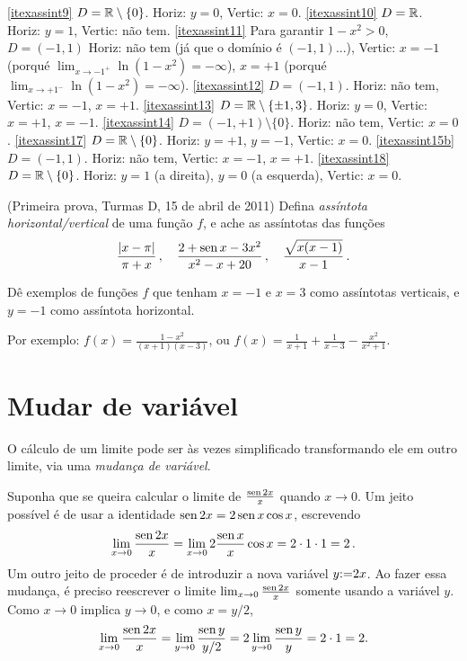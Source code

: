 \begin{exo}
\begin{sol}
\eqref{itexassint9} $D=\mathbb{R}\setminus\{0\}$. Horiz: $y=0$, Vertic: $x=0$.
\eqref{itexassint10} $D=\mathbb{R}$. Horiz: $y=1$, Vertic: não tem.
\eqref{itexassint11} Para garantir $1-x^2>0$, $D=(-1,1)$ Horiz: não 
tem (já que o domínio é $(-1,1)$...), Vertic: $x=-1$ (porqué
$\lim_{x\to -1^+}\ln (1-x^2)=-\infty$), $x=+1$ (porqué $\lim_{x\to
+1^-}\ln (1-x^2)=-\infty$).
\eqref{itexassint12} $D=(-1,1)$. Horiz: não tem, Vertic: $x=-1$, $x=+1$.
\eqref{itexassint13} $D=\mathbb{R}\setminus\{\pm 1, 3\}$. Horiz: $y=0$, 
Vertic: $x=+1$, $x=-1$.
\eqref{itexassint14} $D=(-1,+1)\setminus\{ 0\}$. Horiz: não tem, 
Vertic: $x=0$.
\eqref{itexassint17} $D=\mathbb{R}\setminus\{0\}$. Horiz: $y=+1$, $y=-1$, 
Vertic: $x=0$.
\eqref{itexassint15b} $D=(-1,1)$. Horiz: não tem, Vertic: $x=-1$, $x=+1$.
\eqref{itexassint18} $D=\mathbb{R}\setminus\{0\}$. Horiz: $y=1$ (a direita), $y=0$ (a esquerda), 
Vertic: $x=0$.
\end{sol}
\end{exo}

\begin{exo}(Primeira prova, Turmas D, 15 de abril de 2011)
Defina \emph{assíntota horizontal/vertical} de uma função $f$, e 
ache as assíntotas das funções 
$$
\frac{|x-\pi|}{\pi+x}\,,\quad 
\frac{2+\operatorname{sen} x-3 x^2}{x^2-x+20}
\,,\quad \frac{\sqrt{x(x-1)}}{x-1}\,.$$
\end{exo}

\begin{exo}
Dê exemplos de funções $f$ que tenham $x=-1$ e
$x=3$ como assíntotas verticais, e $y=-1$ como assíntota
horizontal.
\begin{sol}
Por exemplo: $f(x)=\frac{1-x^2}{(x+1)(x-3)}$, ou $f(x)=\frac{1}{x+1}
+\frac{1}{x-3}-\frac{x^2}{x^2+1}$.
\end{sol}
\end{exo}

\section{Mudar de variável}
O cálculo de um limite pode ser às vezes simplificado transformando
ele em outro limite, via uma \emph{mudança de variável}.

\begin{ex}
Suponha que se queira calcular o limite de $\frac{\operatorname{sen} 2x}{x}$ quando
$x\to 0$. Um jeito possível é de usar a identidade 
$\operatorname{sen} 2x=2\operatorname{sen} x\cos x$, escrevendo 
$$
\lim_{x\to 0}\frac{\operatorname{sen} 2x}{x}
=\lim_{x\to 0}2\frac{\operatorname{sen} x}{x}\cos x=2\cdot
1\cdot{1}=2\,.
$$
Um outro jeito de proceder é de introduzir a nova variável $y{:=}
2x$. Ao fazer essa mudança, é preciso reescrever o limite
$\lim_{x\to 0}\frac{\operatorname{sen} 2x}{x}$ somente usando a variável $y$. Como
$x\to 0$ implica $y\to 0$, e como $x=y/2$, 
$$
\lim_{x\to 0}\frac{\operatorname{sen} 2x}{x}
=\lim_{y\to 0}\frac{\operatorname{sen} y}{y/2}=2\lim_{y\to 0}\frac{\operatorname{sen}
y}{y}=2\cdot 1=2.$$
\end{ex}

